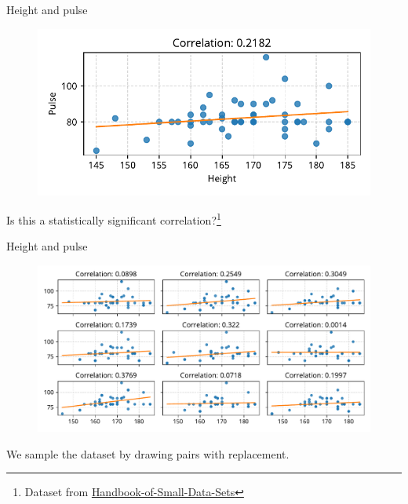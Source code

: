 \documentclass[12pt, aspectratio=149]{beamer}
\theoremstyle{plain}
\begin{document}
\begin{frame}[fragile]{Height and pulse}
\begin{center}
 \begin{figure}
    	\centering
    	\includegraphics[width=0.99\linewidth]{figures/height_pulse_base.pdf}
 \end{figure}
 Is this a statistically significant correlation?\footnote{Dataset from \href{https://github.com/JedStephens/Handbook-of-Small-Data-Sets}{Handbook-of-Small-Data-Sets}}
 \end{center}
\end{frame}

\begin{frame}[fragile]{Height and pulse}
\begin{center}
 \begin{figure}
    	\centering
    	\includegraphics[width=0.99\linewidth]{figures/height_pulse_resamples.pdf}
 \end{figure}
 We sample the dataset by drawing pairs with replacement.
 \end{center}
\end{frame}
\end{document}
